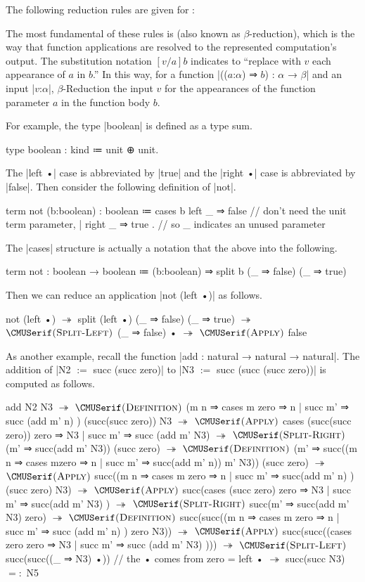 The following reduction rules are given for \LangA:
%


The most fundamental of these rules is  (also known as $β$-reduction),
which is the way that function applications are resolved to
the represented computation's output.
The substitution notation $[v/a]b$ indicates to
``replace with $v$ each appearance of $a$ in $b$.''
In this way, for a function \code|(($a$:$α$) ⇒ $b$) : $α$ → $β$| and
an input \code|$v$:$α$|,
$β$-Reduction  the input $v$ for the appearances of the function parameter $a$ in the function body $b$.

For example, the type \code|boolean| is defined as a type sum.
%
\begin{snippet}
type boolean : kind ≔ unit ⊕ unit.
\end{snippet}
The \code|left •| case is abbreviated by \code|true| and the \code|right •| case is abbreviated by \code|false|.
Then consider the following definition of \code|not|.
%
\newpage
\begin{snippet}
term not (b:boolean) : boolean
  ≔ cases b
      { left  _ ⇒ false   // don't need the unit term parameter,
      | right _ ⇒ true }. // so _ indicates an unused parameter
\end{snippet}
%
The \code|cases| structure is actually a notation that the above into the following.
%
\begin{snippet}
term not : boolean → boolean
  ≔ (b:boolean) ⇒ split b (_ ⇒ false) (_ ⇒ true)
\end{snippet}
%
Then we can reduce an application \code|not (left •)| as follows.
%
\begin{snippet}
not (left •)
$↠$
split (left •) (_ ⇒ false) (_ ⇒ true)
$↠$ $\ruleapp{Split-Left}$
(_ ⇒ false) •
$↠$ $\ruleapp{Apply}$
false
\end{snippet}

\newpage
As another example, recall the function \code|add : natural → natural → natural|.
The addition of \code|N2 $:=$ succ (succ zero)| to \code|N3 $:=$ succ (succ (succ zero))| is computed as follows.
%
\begin{snippet}
add N2 N3
$↠$ $\ruleapp{Definition}$
(m n ⇒ cases m{ zero ⇒ n | succ m' ⇒ succ (add m' n) })
  (succ(succ zero)) N3
$↠$ $\ruleapp{Apply}$
cases (succ(succ zero)){ zero ⇒ N3 | succ m' ⇒ succ (add m' N3) }
$↠$ $\ruleapp{Split-Right}$
(m' ⇒ succ(add m' N3)) (succ zero)
$↠$ $\ruleapp{Definition}$
(m' ⇒ succ((m n ⇒ cases m{zero ⇒ n | succ m' ⇒ succ(add m' n)}) m' N3))
  (succ zero)
$↠$ $\ruleapp{Apply}$
succ((m n ⇒ cases m
              { zero ⇒ n | succ m' ⇒ succ(add m' n) }) (succ zero) N3)
$↠$ $\ruleapp{Apply}$
succ(cases (succ zero){ zero ⇒ N3 | succ m' ⇒ succ(add m' N3) })
$↠$ $\ruleapp{Split-Right}$
succ(m' ⇒ succ(add m' N3) zero)
$↠$ $\ruleapp{Definition}$
succ(succ((m n ⇒ cases m
                  { zero ⇒ n | succ m' ⇒ succ (add m' n) }) zero N3))
$↠$ $\ruleapp{Apply}$
succ(succ((cases zero{ zero ⇒ N3 | succ m' ⇒ succ (add m' N3) })))
$↠$ $\ruleapp{Split-Left}$
succ(succ((_ ⇒ N3) •)) // the • comes from zero = left •
$↠$
succ(succ N3)
$=:$
N5
\end{snippet}

